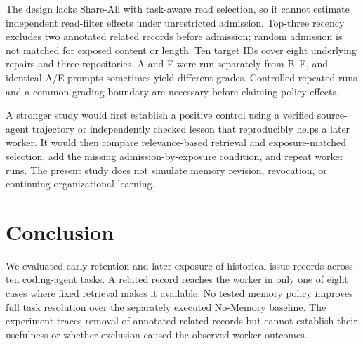 \documentclass[sigconf,anonymous]{aamas}
\begin{document}
The design lacks Share-All with task-aware read selection, so it cannot estimate independent read-filter effects under unrestricted admission. Top-three recency excludes two annotated related records before admission; random admission is not matched for exposed content or length. Ten target IDs cover eight underlying repairs and three repositories. A and F were run separately from B--E, and identical A/E prompts sometimes yield different grades. Controlled repeated runs and a common grading boundary are necessary before claiming policy effects.

A stronger study would first establish a positive control using a verified source-agent trajectory or independently checked lesson that reproducibly helps a later worker. It would then compare relevance-based retrieval and exposure-matched selection, add the missing admission-by-exposure condition, and repeat worker runs. The present study does not simulate memory revision, revocation, or continuing organizational learning.

\section{Conclusion}
We evaluated early retention and later exposure of historical issue records across ten coding-agent tasks. A related record reaches the worker in only one of eight cases where fixed retrieval makes it available. No tested memory policy improves full task resolution over the separately executed No-Memory baseline. The experiment traces removal of annotated related records but cannot establish their usefulness or whether exclusion caused the observed worker outcomes.



\end{document}
